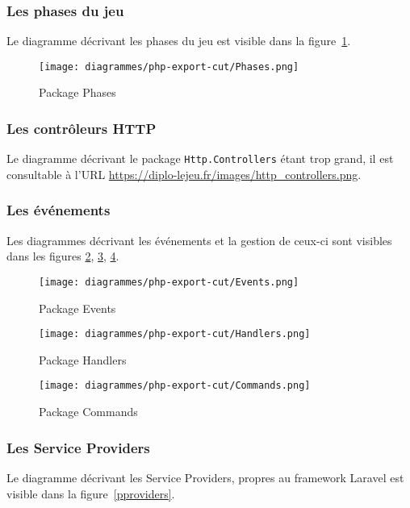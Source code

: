 		\subsubsection{Les phases du jeu}
		Le diagramme décrivant les phases du jeu est visible dans la figure~\ref{pphases}.

			\begin{figure}[H]
				\centering
				\texttt{[image: diagrammes/php-export-cut/Phases.png]}
				\caption{\label{pphases}Package Phases}
			\end{figure}

		\subsubsection{Les contrôleurs HTTP}
		Le diagramme décrivant le package \verb|Http.Controllers| étant trop grand, il est consultable à l'URL \url{https://diplo-lejeu.fr/images/http\_controllers.png}.

		\subsubsection{Les événements}
		Les diagrammes décrivant les événements et la gestion de ceux-ci sont visibles dans les figures \ref{pevents}, \ref{phandlers}, \ref{pcommands}.

			\begin{figure}[H]
				\centering
				\texttt{[image: diagrammes/php-export-cut/Events.png]}
				\caption{\label{pevents}Package Events}
			\end{figure}

			\begin{figure}[H]
				\centering
				\texttt{[image: diagrammes/php-export-cut/Handlers.png]}
				\caption{\label{phandlers}Package Handlers}
			\end{figure}

			\begin{figure}[H]
				\centering
				\texttt{[image: diagrammes/php-export-cut/Commands.png]}
				\caption{\label{pcommands}Package Commands}
			\end{figure}

		\subsubsection{Les Service Providers}
		Le diagramme décrivant les Service Providers, propres au framework Laravel est visible dans la figure~\ref{pproviders}.

